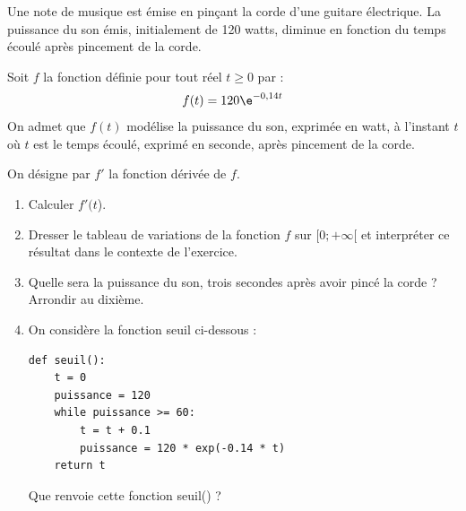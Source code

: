 \medskip

Une note de musique est émise en pinçant la corde d'une guitare électrique. La puissance du son émis, initialement de 120 watts, diminue en fonction du temps écoulé après pincement de la corde.

Soit $f$ la fonction définie pour tout réel $t\geqslant 0$ par :\[f(t)= 120\e^{-0,14t}\]
On admet que $f(t)$ modélise la puissance du son, exprimée en watt, à l'instant $t$ où $t$ est le temps écoulé, exprimé en seconde, après pincement de la corde.

On désigne par $f'$ la fonction dérivée de $f$.

\medskip

\begin{enumerate}
\item Calculer $f'(t$).
\item Dresser le tableau de variations de la fonction $f$ sur $[0 ; +\infty[$ et interpréter ce résultat dans le contexte de l'exercice.
\item Quelle sera la puissance du son, trois secondes après avoir pincé la corde ? Arrondir au dixième.
\item On considère la fonction seuil ci-dessous :
\begin{lstlisting}[style=python]
def seuil():
    t = 0
    puissance = 120
    while puissance >= 60:
        t = t + 0.1
        puissance = 120 * exp(-0.14 * t)
    return t
\end{lstlisting}

Que renvoie cette fonction seuil() ?
\end{enumerate}

\vspace{0,5cm}
